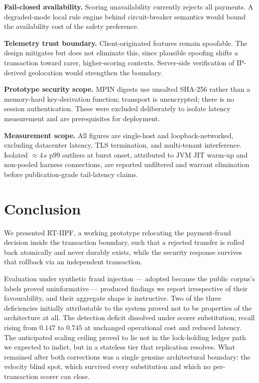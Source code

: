 \documentclass[journal]{IEEEtran}
\begin{document}
\textbf{Fail-closed availability.} Scoring unavailability currently rejects
all payments. A degraded-mode local rule engine behind circuit-breaker
semantics would bound the availability cost of the safety preference.

\textbf{Telemetry trust boundary.} Client-originated features remain
spoofable. The design mitigates but does not eliminate this, since plausible
spoofing shifts a transaction toward rarer, higher-scoring contexts.
Server-side verification of IP-derived geolocation would strengthen the
boundary.

\textbf{Prototype security scope.} MPIN digests use unsalted SHA-256 rather
than a memory-hard key-derivation function; transport is unencrypted; there
is no session authentication. These were excluded deliberately to isolate
latency measurement and are prerequisites for deployment.

\textbf{Measurement scope.} All figures are single-host and
loopback-networked, excluding datacenter latency, TLS termination, and
multi-tenant interference. Isolated ${\approx}4$\,s p99 outliers at burst
onset, attributed to JVM JIT warm-up and non-pooled harness connections,
are reported unfiltered and warrant elimination before publication-grade
tail-latency claims.

\section{Conclusion}

We presented RT-IIPF, a working prototype relocating the payment-fraud
decision inside the transaction boundary, such that a rejected transfer is
rolled back atomically and never durably exists, while the security response
survives that rollback via an independent transaction.

Evaluation under synthetic fraud injection --- adopted because the public
corpus's labels proved uninformative --- produced findings we report
irrespective of their favourability, and their aggregate shape is
instructive. Two of the three deficiencies initially attributable to the
system proved not to be properties of the architecture at all. The
detection deficit dissolved under scorer substitution, recall rising from
$0.147$ to $0.745$ at unchanged operational cost and reduced latency. The
anticipated scaling ceiling proved to lie not in the lock-holding ledger
path we expected to indict, but in a stateless tier that replication
resolves. What remained after both corrections was a single genuine
architectural boundary: the velocity blind spot, which survived every
substitution and which no per-transaction scorer can close.
\end{document}
